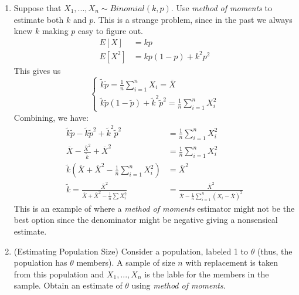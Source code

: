 \documentclass{article}
\begin{document}
\begin{enumerate}
    \item Suppose that $X_1,...,X_n \sim Binomial(k,p)$. Use \textit{method of moments} to estimate both $k$ and $p$. This is a strange problem, since in the past we always knew $k$ making $p$ easy to figure out.
    \begin{equation*}
        \begin{split}
            E[X] &= kp\\
            E[X^2] &= kp(1-p) + k^2 p^2
        \end{split}
    \end{equation*}
    This gives us
    \begin{equation*}
        \begin{cases}
            \widetilde{k}\widetilde{p} = \frac{1}{n}\sum_{i=1}^n X_i = \overline{X}\\
            \widetilde{k}\widetilde{p}(1-\widetilde{p}) + \widetilde{k}^2 \widetilde{p}^2 = \frac{1}{n}\sum_{i=1}^n X_i^2
        \end{cases}
    \end{equation*}
    Combining, we have:
    \begin{equation*}
        \begin{split}
            \widetilde{k}\widetilde{p}-\widetilde{k}\widetilde{p}^2 + \widetilde{k}^2 \widetilde{p}^2 &= \frac{1}{n} \sum_{i=1}^n X_i^2\\
            \overline{X} - \frac{\overline{X}^2}{\widetilde{k}} + \overline{X}^2 &= \frac{1}{n} \sum_{i=1}^n X_i^2\\
            \widetilde{k}\left(\overline{X} + \overline{X}^2 - \frac{1}{n}\sum_{i=1}^n X_i^2\right) &= \overline{X}^2\\
            \widetilde{k} = \frac{\overline{X}^2}{\overline{X}+\overline{X}^2 - \frac{1}{n}\sum X_i^2} &= \frac{\overline{X}^2}{\overline{X}-\frac{1}{n}\sum_{i=1}^n (X_i - \overline{X})^2}
        \end{split}
    \end{equation*}
    This is an example of where a \textit{method of moments} estimator might not be the best option since the denominator might be negative giving a nonsensical estimate.

    \item (Estimating Population Size) Consider a population, labeled 1 to $\theta$ (thus, the population has $\theta$ members). A sample of size $n$ with replacement is taken from this population and $X_1,...,X_n$ is the lable for the members in the sample. Obtain an estimate of $\theta$ using \textit{method of moments}.


\end{enumerate}
\end{document}
